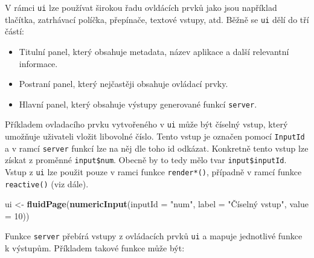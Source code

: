 \documentclass[12pt,]{article}
\newenvironment{Shaded}{\begin{snugshade}}{\end{snugshade}}
\newcommand{\KeywordTok}[1]{\textcolor[rgb]{0.13,0.29,0.53}{\textbf{#1}}}
\newcommand{\DataTypeTok}[1]{\textcolor[rgb]{0.13,0.29,0.53}{#1}}
\newcommand{\DecValTok}[1]{\textcolor[rgb]{0.00,0.00,0.81}{#1}}
\newcommand{\StringTok}[1]{\textcolor[rgb]{0.31,0.60,0.02}{#1}}
\newcommand{\OperatorTok}[1]{\textcolor[rgb]{0.81,0.36,0.00}{\textbf{#1}}}
\newcommand{\NormalTok}[1]{#1}
\providecommand{\tightlist}{%
  \setlength{\itemsep}{0pt}\setlength{\parskip}{0pt}}
\begin{document}
\newpage

V rámci \texttt{ui} lze používat širokou řadu ovldácích prvků jako jsou
například tlačítka, zatrhávací políčka, přepínače, textové vstupy, atd.
Běžně se \texttt{ui} dělí do tří částí:

\begin{itemize}
\tightlist
\item
  Titulní panel, který obsahuje metadata, název aplikace a další
  relevantní informace.
\item
  Postraní panel, který nejčastěji obsahuje ovládací prvky.
\item
  Hlavní panel, který obsahuje výstupy generované funkcí
  \texttt{server}.
\end{itemize}

Příkladem ovladacího prvku vytvořeného v \texttt{ui} může být číselný
vstup, který umožňuje uživateli vložit libovolné číslo. Tento vstup je
označen pomocí \texttt{InputId} a v ramcí \texttt{server} funkcí lze na
něj dle toho id odkázat. Konkretně tento vstup lze získat z proměnné
\texttt{input\$num}. Obecně by to tedy mělo tvar
\texttt{input\$inputId}. Vstup z \texttt{ui} lze použit pouze v ramci
funkce \texttt{render*()}, případně v ramcí funkce \texttt{reactive()}
(viz dále).

\begin{Shaded}
\begin{Highlighting}[]
\NormalTok{ui <-}\StringTok{ }\KeywordTok{fluidPage}\NormalTok{(}\KeywordTok{numericInput}\NormalTok{(}\DataTypeTok{inputId =} \StringTok{"num"}\NormalTok{,}
                             \DataTypeTok{label =} \StringTok{"Číselný vstup"}\NormalTok{,}
                             \DataTypeTok{value =} \DecValTok{10}\NormalTok{))}
\end{Highlighting}
\end{Shaded}

Funkce \texttt{server} přebírá vstupy z ovládacích prvků \texttt{ui} a
mapuje jednotlivé funkce k výstupům. Příkladem takové funkce může být:

\begin{Shaded}
\end{Shaded}
\end{document}
